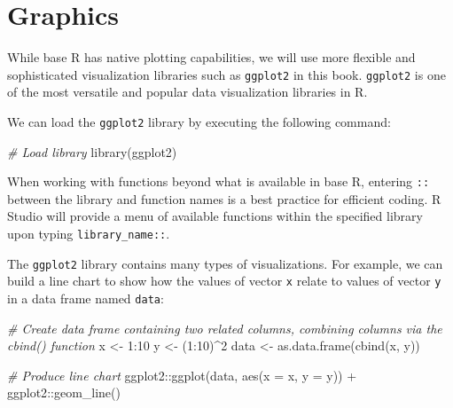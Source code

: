\documentclass[
]{book}
\newenvironment{Shaded}{\begin{snugshade}}{\end{snugshade}}
\newcommand{\AttributeTok}[1]{\textcolor[rgb]{0.77,0.63,0.00}{#1}}
\newcommand{\CommentTok}[1]{\textcolor[rgb]{0.56,0.35,0.01}{\textit{#1}}}
\newcommand{\DecValTok}[1]{\textcolor[rgb]{0.00,0.00,0.81}{#1}}
\newcommand{\FunctionTok}[1]{\textcolor[rgb]{0.00,0.00,0.00}{#1}}
\newcommand{\NormalTok}[1]{#1}
\newcommand{\OtherTok}[1]{\textcolor[rgb]{0.56,0.35,0.01}{#1}}
\newcommand{\SpecialCharTok}[1]{\textcolor[rgb]{0.00,0.00,0.00}{#1}}
\begin{document}
\hypertarget{graphics}{%
\section{Graphics}\label{graphics}}

While base R has native plotting capabilities, we will use more flexible and sophisticated visualization libraries such as \texttt{ggplot2} in this book. \texttt{ggplot2} is one of the most versatile and popular data visualization libraries in R.

We can load the \texttt{ggplot2} library by executing the following command:

\begin{Shaded}
\begin{Highlighting}[]
\CommentTok{\# Load library}
\FunctionTok{library}\NormalTok{(ggplot2)}
\end{Highlighting}
\end{Shaded}

When working with functions beyond what is available in base R, entering \texttt{::} between the library and function names is a best practice for efficient coding. R Studio will provide a menu of available functions within the specified library upon typing \texttt{library\_name::}.

The \texttt{ggplot2} library contains many types of visualizations. For example, we can build a line chart to show how the values of vector \texttt{x} relate to values of vector \texttt{y} in a data frame named \texttt{data}:

\begin{Shaded}
\begin{Highlighting}[]
\CommentTok{\# Create data frame containing two related columns, combining columns via the cbind() function}
\NormalTok{x }\OtherTok{\textless{}{-}} \DecValTok{1}\SpecialCharTok{:}\DecValTok{10}
\NormalTok{y }\OtherTok{\textless{}{-}}\NormalTok{ (}\DecValTok{1}\SpecialCharTok{:}\DecValTok{10}\NormalTok{)}\SpecialCharTok{\^{}}\DecValTok{2}
\NormalTok{data }\OtherTok{\textless{}{-}} \FunctionTok{as.data.frame}\NormalTok{(}\FunctionTok{cbind}\NormalTok{(x, y))}

\CommentTok{\# Produce line chart}
\NormalTok{ggplot2}\SpecialCharTok{::}\FunctionTok{ggplot}\NormalTok{(data, }\FunctionTok{aes}\NormalTok{(}\AttributeTok{x =}\NormalTok{ x, }\AttributeTok{y =}\NormalTok{ y)) }\SpecialCharTok{+}
\NormalTok{ggplot2}\SpecialCharTok{::}\FunctionTok{geom\_line}\NormalTok{()}
\end{Highlighting}
\end{Shaded}
\end{document}
